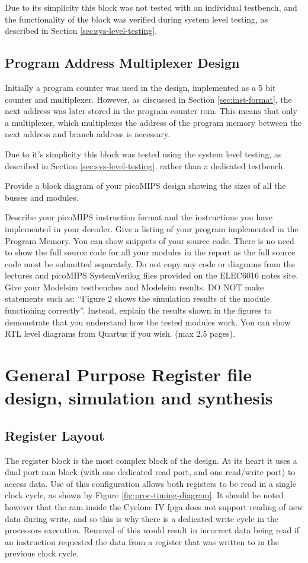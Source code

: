 Due to its simplicity this block was not tested with an individual testbench, and the functionality of the block was verified during system level testing, as described in Section \ref{sec:sys-level-testing}.

\subsection{Program Address Multiplexer Design}
Initially a program counter was used in the design, implemented as a 5 bit counter and multiplexer. However, as discussed in Section \ref{sec:inst-format}, the next address was later stored in the program counter \gls{rom}. This means that only a multiplexer, which multiplexes the address of the program memory between the next address and branch address is necessary.

Due to it's simplicity this block was tested using the system level testing, as described in Section \ref{sec:sys-level-testing}, rather than a dedicated testbench.


\review
{
	Provide a block diagram of your picoMIPS design showing the sizes of all the busses and modules.
	
	Describe your picoMIPS instruction format and the instructions you have implemented in your decoder.
	Give a listing of your program implemented in the Program Memory. You can show snippets of your source code.
	There is no need to show the full source code for all your modules in the report as the full source code must be submitted separately.
	Do not copy any code or diagrams from the lectures and picoMIPS SystemVerilog files provided on the ELEC6016 notes site.
	Give your Modelsim testbenches and Modelsim results.
	DO NOT make statements such as: “Figure 2 shows the simulation results of the module functioning correctly”.
	Instead, explain the results shown in the figures to demonstrate that you understand how the tested modules work.
	You can show RTL level diagrams from Quartus if you wish. (max 2.5 pages).
}


\section{General Purpose Register file design, simulation and synthesis}

\subsection{Register Layout}

The register block is the most complex block of the design. At its heart it uses a dual port \gls{ram} block (with one dedicated read port, and one read/write port) to access data. Use of this configuration allows both registers to be read in a single clock cycle, as shown by Figure \ref{fig:proc-timing-diagram}. It should be noted however that the \gls{ram} inside the Cyclone IV \gls{fpga} does not support reading of new data during write, and so this is why there is a dedicated write cycle in the processors execution. Removal of this would result in incorrect data being read if an instruction requested the data from a register that was written to in the previous clock cycle.

